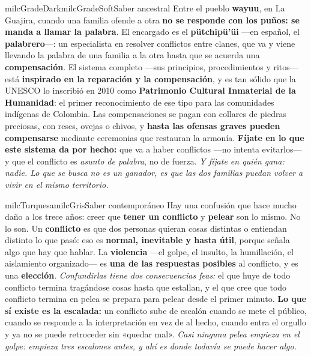 \documentclass[11pt,letterpaper]{article}
\begin{document}
\begin{softbox}{milcGradeDark}{milcGradeSoft}{Saber ancestral}
Entre el pueblo \textbf{wayuu}, en La Guajira, cuando una familia ofende a otra \textbf{no se responde con los puños: se manda a llamar la palabra}. El encargado es el \textbf{pütchipü'üi} ---en español, el \textbf{palabrero}---: un especialista en resolver conflictos entre clanes, que va y viene llevando la palabra de una familia a la otra hasta que se acuerda una \textbf{compensación}. El sistema completo ---sus principios, procedimientos y ritos--- está \textbf{inspirado en la reparación y la compensación}, y es tan sólido que la UNESCO lo inscribió en 2010 como \textbf{Patrimonio Cultural Inmaterial de la Humanidad}: el primer reconocimiento de ese tipo para las comunidades indígenas de Colombia. Las compensaciones se pagan con collares de piedras preciosas, con reses, ovejas o chivos, y \textbf{hasta las ofensas graves pueden compensarse} mediante ceremonias que restauran la armonía. \textbf{Fíjate en lo que este sistema da por hecho:} que va a haber conflictos ---no intenta evitarlos--- y que el conflicto es \emph{asunto de palabra}, no de fuerza. \emph{Y fíjate en quién gana: nadie. Lo que se busca no es un ganador, es que las dos familias puedan volver a vivir en el mismo territorio.}
\end{softbox}

\begin{softbox}{milcTurquesa}{milcGris}{Saber contemporáneo}
Hay una confusión que hace mucho daño a los trece años: creer que \textbf{tener un conflicto} y \textbf{pelear} son lo mismo. No lo son. Un \textbf{conflicto} es que dos personas quieran cosas distintas o entiendan distinto lo que pasó: eso es \textbf{normal, inevitable y hasta útil}, porque señala algo que hay que hablar. La \textbf{violencia} ---el golpe, el insulto, la humillación, el aislamiento organizado--- es \textbf{una de las respuestas posibles} al conflicto, y es una \textbf{elección}. \emph{Confundirlas tiene dos consecuencias feas:} el que huye de todo conflicto termina tragándose cosas hasta que estallan, y el que cree que todo conflicto termina en pelea se prepara para pelear desde el primer minuto. \textbf{Lo que sí existe es la escalada:} un conflicto sube de escalón cuando se mete el público, cuando se responde a la interpretación en vez de al hecho, cuando entra el orgullo y ya no se puede retroceder sin «quedar mal». \emph{Casi ninguna pelea empieza en el golpe: empieza tres escalones antes, y ahí es donde todavía se puede hacer algo.}
\end{softbox}
\end{document}
